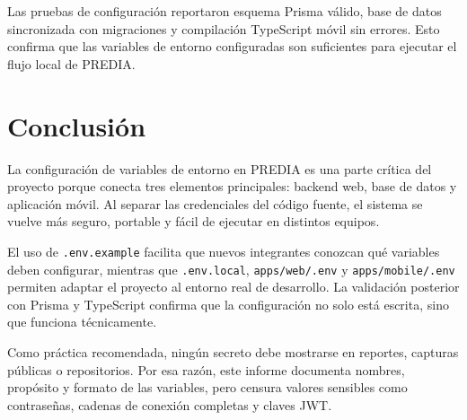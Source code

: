 \documentclass[12pt,a4paper]{article}
\begin{document}
\begin{tcolorbox}[colback=prediaLight,colframe=prediaBorder,arc=2mm,boxrule=0.6pt,title={Resumen de validación}]
Las pruebas de configuración reportaron esquema Prisma válido, base de datos sincronizada con migraciones y compilación TypeScript móvil sin errores. Esto confirma que las variables de entorno configuradas son suficientes para ejecutar el flujo local de PREDIA.
\end{tcolorbox}

\section{Conclusión}

La configuración de variables de entorno en PREDIA es una parte crítica del proyecto porque conecta tres elementos principales: backend web, base de datos y aplicación móvil. Al separar las credenciales del código fuente, el sistema se vuelve más seguro, portable y fácil de ejecutar en distintos equipos.

El uso de \texttt{.env.example} facilita que nuevos integrantes conozcan qué variables deben configurar, mientras que \texttt{.env.local}, \texttt{apps/web/.env} y \texttt{apps/mobile/.env} permiten adaptar el proyecto al entorno real de desarrollo. La validación posterior con Prisma y TypeScript confirma que la configuración no solo está escrita, sino que funciona técnicamente.

Como práctica recomendada, ningún secreto debe mostrarse en reportes, capturas públicas o repositorios. Por esa razón, este informe documenta nombres, propósito y formato de las variables, pero censura valores sensibles como contraseñas, cadenas de conexión completas y claves JWT.
\end{document}
